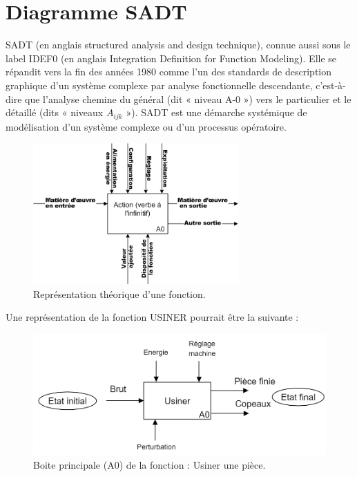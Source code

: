 \documentclass[
	11pt, %
	fleqn, %
	a4paper, %
]{LegrandOrangeBook}
\begin{document}
\section{Diagramme SADT}
SADT (en anglais structured analysis and design technique), connue aussi sous le label IDEF0 (en anglais Integration Definition for Function Modeling). Elle se répandit vers la fin des années 1980 comme l'un des standards de description graphique d'un système complexe par analyse fonctionnelle descendante, c'est-à-dire que l'analyse chemine du général (dit « niveau A-0 ») vers le particulier et le détaillé (dits « niveaux $A_{ijk}$ »). SADT est une démarche systémique de modélisation d'un système complexe ou d'un processus opératoire.

\begin{figure}[H] %
	\centering %
	\includegraphics[width=0.7\textwidth]{Images/Sadt.png} %
	\caption{Représentation théorique d'une fonction.}
	\label{sadt} %
\end{figure}
Une représentation de la fonction USINER pourrait être la suivante :
\begin{figure}[H] %
	\centering %
	\includegraphics[width=1\textwidth]{Images/sadt1.png} %
	\caption{Boite principale (A0) de la fonction : Usiner une pièce.}
	\label{sadt1} %
\end{figure}
\end{document}
